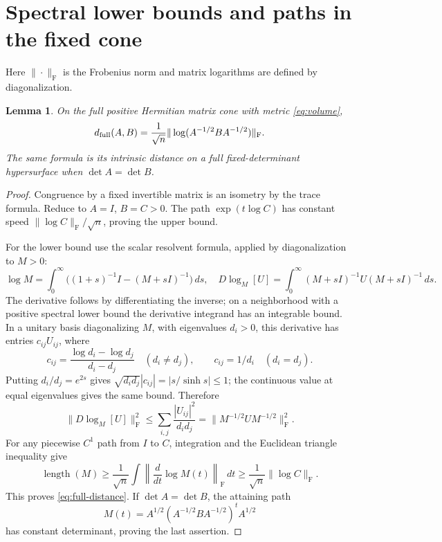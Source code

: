 \documentclass[11pt]{article}
\newtheorem{lemma}[theorem]{Lemma}
\newcommand{\Frob}{\mathrm F}
\begin{document}
\section{Spectral lower bounds and paths in the fixed cone}
Here $\|\cdot\|_\Frob$ is the Frobenius norm and matrix logarithms are
defined by diagonalization.
\begin{lemma}\label{lem:distance}
On the full positive Hermitian matrix cone with metric \eqref{eq:volume},
\begin{equation}\label{eq:full-distance}
 d_{\rm full}(A,B)=\frac1{\sqrt n}
                   \|\log(A^{-1/2}BA^{-1/2})\|_\Frob.
\end{equation}
The same formula is its intrinsic distance on a full fixed-determinant
hypersurface when $\det A=\det B$.
\end{lemma}
\begin{proof}
Congruence by a fixed invertible matrix is an isometry by the trace
formula. Reduce to $A=I$, $B=C>0$. The path $\exp(t\log C)$ has constant
speed $\|\log C\|_\Frob/\sqrt n$, proving the upper bound.

For the lower bound use the scalar resolvent formula, applied by
diagonalization to $M>0$:
\[
 \log M=\int_0^\infty\bigl((1+s)^{-1}I-(M+sI)^{-1}\bigr)\,ds,
 \quad D\log_M[U]=\int_0^\infty(M+sI)^{-1}U(M+sI)^{-1}\,ds.
\]
The derivative follows by differentiating the inverse; on a neighborhood
with a positive spectral lower bound the derivative integrand has an
integrable bound. In a unitary basis diagonalizing $M$, with eigenvalues
$d_i>0$, this derivative has entries $c_{ij}U_{ij}$, where
\[
 c_{ij}=\frac{\log d_i-\log d_j}{d_i-d_j}\quad(d_i\ne d_j),
 \qquad c_{ij}=1/d_i\quad(d_i=d_j).
\]
Putting $d_i/d_j=e^{2s}$ gives
$\sqrt{d_id_j}|c_{ij}|=|s/\sinh s|\leq1$; the continuous value at
equal eigenvalues gives the same bound. Therefore
\[
 \|D\log_M[U]\|_\Frob^2
 \leq\sum_{i,j}\frac{|U_{ij}|^2}{d_id_j}
 =\|M^{-1/2}UM^{-1/2}\|_\Frob^2.
\]
For any piecewise $C^1$ path from $I$ to $C$, integration and the
Euclidean triangle inequality give
\[
 \operatorname{length}(M)\geq\frac1{\sqrt n}
       \int\left\|\frac{d}{dt}\log M(t)\right\|_\Frob\,dt
 \geq\frac1{\sqrt n}\|\log C\|_\Frob.
\]
This proves \eqref{eq:full-distance}. If $\det A=\det B$, the attaining
path
\begin{equation}\label{eq:geodesic}
 M(t)=A^{1/2}(A^{-1/2}BA^{-1/2})^tA^{1/2}
\end{equation}
has constant determinant, proving the last assertion.
\end{proof}
\end{document}
